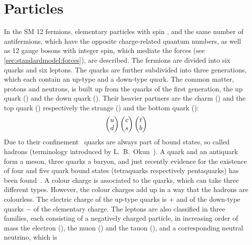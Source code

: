 
\section{Particles}
\label{sec:standardmodel:particles}

In the SM 12 fermions, elementary particles with spin , and the
same number of antifermions, which have the opposite charge-related quantum
numbers, as well as 12 gauge bosons with integer spin, which mediate the
forces (see \cref{sec:standardmodel:forces}), are described. The fermions are
divided into six quarks and six leptons. The quarks are further subdivided
into three generations, which each contain an up-type and a down-type quark.
The common matter, protons and neutrons, is built up from the quarks of the
first generation, the up quark (\uquark) and the down quark (\dquark). Their
heavier partners are the charm (\cquark) and the top quark (\tquark)
respectively the strange (\squark) and the bottom quark (\bquark):
\begin{align}
\begin{pmatrix}
{\ensuremath{u}} \\ {d}
\end{pmatrix}
\begin{pmatrix}
{\ensuremath{c}} \\ {s}
\end{pmatrix}
\begin{pmatrix}
{\ensuremath{t}}	\\ {b}
\end{pmatrix}
\end{align}
Due to their confinement~\cite{Confinement} quarks are
always part of bound states, so called hadrons (terminology introduced by
L.~B.~Okun~\cite{Okun:1962kca}). A quark and an antiquark form a meson, three
quarks a baryon, and just recently evidence for the existence of four and five
quark bound states (tetraquarks respectively pentaquarks) has been
found~\cite{LHCb-PAPER-2016-018,*LHCb-PAPER-2016-019,LHCb-PAPER-2015-029,LHCb-PAPER-2016-015}.
A colour charge is associated to the quarks, which can take three different
types. However, the colour charges add up in a way that the hadrons are
colourless. The electric charge of the up-type quarks is + and of
the down-type quarks $-$ of the elementary charge. The leptons are
also classified in three families, each consisting of a negatively charged
particle, in increasing order of mass the electron (\electron), the muon
(\muon) and the tauon (\tauon), and a corresponding neutral neutrino, which is
